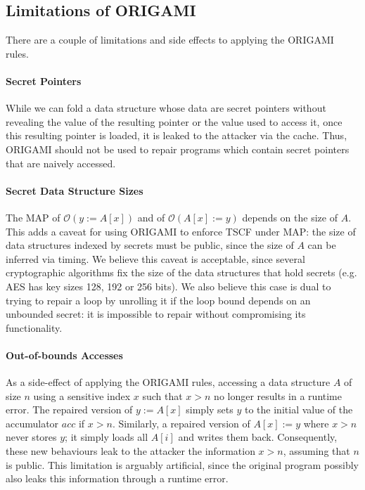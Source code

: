 {\subsection{Limitations of ORIGAMI}
\label{sec:Limitations}
There are a couple of limitations and side effects to applying the ORIGAMI rules. 

\paragraph*{Secret Pointers} While we can fold a data structure whose data are secret pointers without revealing the value of the resulting pointer or the value used to access it, once this resulting pointer is loaded, it is leaked to the attacker via the cache. Thus, ORIGAMI should not be used to repair programs which contain secret pointers that are naively accessed. %

\paragraph*{Secret Data Structure Sizes} The MAP of $\mathscr{O}(y:=A[x])$ and of $\mathscr{O}(A[x]:=y)$ depends on the size of $A$. This adds a caveat for using ORIGAMI to enforce TSCF under MAP: the size of data structures indexed by secrets must be public, since the size of $A$ can be inferred via timing. We believe this caveat is acceptable, since several cryptographic algorithms fix the size of the data structures that hold secrets (e.g. AES has key sizes 128, 192 or 256 bits). We also believe this case is dual to trying to repair a loop by unrolling it if the loop bound depends on an unbounded secret: it is impossible to repair without compromising its functionality\cite{SCEliminator,MSESC}.

\paragraph*{Out-of-bounds Accesses} As a side-effect of applying the ORIGAMI rules, accessing a data structure $A$ of size $n$ using a sensitive index $x$ such that $x>n$ no longer results in a runtime error. The repaired version of $y:=A[x]$ simply sets $y$ to the initial value of the accumulator $acc$ if $x>n$. Similarly, a repaired version of $A[x]:=y$ where $x>n$ never stores $y$; it simply loads all $A[i]$ and writes them back. Consequently, these new behaviours leak to the attacker the information $x>n$, assuming that $n$ is public. This limitation is arguably artificial, since the original program possibly also leaks this information through a runtime error.

}
